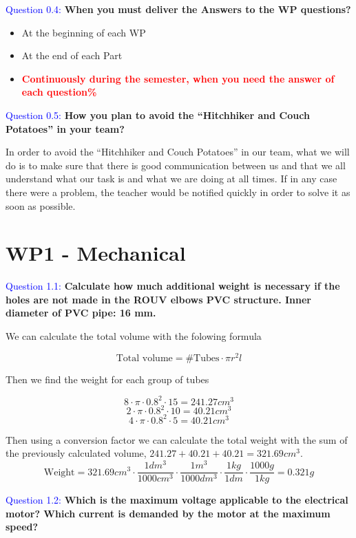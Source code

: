 \documentclass[12pt, a4papre]{article}
\begin{document}
	\textcolor{blue}{Question 0.4:} \textbf{When you must deliver the Answers to the WP questions?}
	\begin{itemize}
		\item At the beginning of each WP
		\item At the end of each Part
		\item \textcolor{red}{ \textbf{Continuously during the semester, when you need the answer of each question\%}}
	\end{itemize}
	
	\textcolor{blue}{Question 0.5:} \textbf{How you plan to avoid the “Hitchhiker and Couch Potatoes” in your team?}
	
	In order to avoid the “Hitchhiker and Couch Potatoes” in our team, what we will do is to make sure that there is good communication between us and that we all understand what our task is and what we are doing at all times. If in any case there were a problem, the teacher would be notified quickly in order to solve it as soon as possible.
	
	\newpage
	
	\section{WP1 - Mechanical}
	\textcolor{blue}{Question 1.1:} \textbf{Calculate how much additional weight is necessary if the holes are not made in the ROUV elbows PVC structure. Inner diameter of PVC pipe: 16 mm.}
	
	We can calculate the total volume with the folowing formula
	
	\[
		\text{Total volume} = \text{\#Tubes}\cdot\pi r^2 l
	\]
	
	Then we find the weight for each group of tubes
	
	\[
		8\cdot \pi \cdot0.8^2\cdot 15 = 241.27 cm^3
	\]
	\[
		2\cdot \pi \cdot0.8^2\cdot 10 = 40.21 cm^3
	\]
	\[
		4\cdot \pi \cdot0.8^2\cdot 5 = 40.21 cm^3
	\]
	
	Then using a conversion factor we can calculate the total weight with the sum of the previously calculated volume, $241.27 + 40.21 + 40.21 = 321.69 cm^3$.
	\[
		\text{Weight} = 321.69cm^3\cdot \frac{1dm^3}{1000cm^3}\cdot \frac{1m^3}{1000dm^3}\cdot \frac{1kg}{1dm}\cdot \frac{1000g}{1kg} = 0.321 g
	\]
	
	\textcolor{blue}{Question 1.2:} \textbf{Which is the maximum voltage applicable to the electrical motor? Which current is demanded by the motor at the maximum speed?}
	
\end{document}
